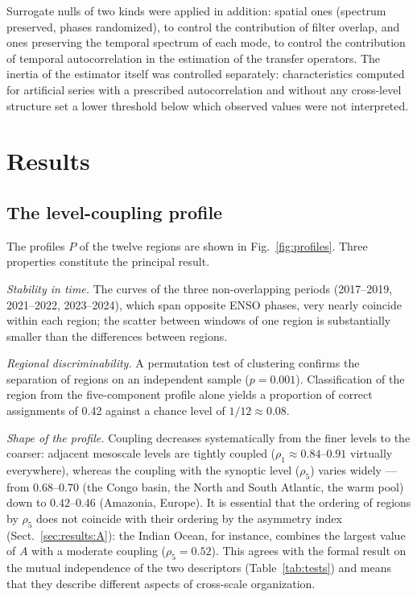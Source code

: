 \documentclass[11pt,a4paper]{article}
\begin{document}
Surrogate nulls of two kinds were applied in addition: spatial ones (spectrum preserved, phases randomized), to control the contribution of filter overlap, and ones preserving the temporal spectrum of each mode, to control the contribution of temporal autocorrelation in the estimation of the transfer operators. The inertia of the estimator itself was controlled separately: characteristics computed for artificial series with a prescribed autocorrelation and without any cross-level structure set a lower threshold below which observed values were not interpreted.

\section{Results}
\label{sec:results}

\subsection{The level-coupling profile}
\label{sec:results:P}

The profiles $P$ of the twelve regions are shown in Fig.~\ref{fig:profiles}. Three properties constitute the principal result.

\emph{Stability in time.} The curves of the three non-overlapping periods (2017--2019, 2021--2022, 2023--2024), which span opposite ENSO phases, very nearly coincide within each region; the scatter between windows of one region is substantially smaller than the differences between regions.

\emph{Regional discriminability.} A permutation test of clustering confirms the separation of regions on an independent sample ($p=0.001$). Classification of the region from the five-component profile alone yields a proportion of correct assignments of 0.42 against a chance level of $1/12\approx0.08$.

\emph{Shape of the profile.} Coupling decreases systematically from the finer levels to the coarser: adjacent mesoscale levels are tightly coupled ($\rho_1\approx0.84$--$0.91$ virtually everywhere), whereas the coupling with the synoptic level ($\rho_5$) varies widely --- from $0.68$--$0.70$ (the Congo basin, the North and South Atlantic, the warm pool) down to $0.42$--$0.46$ (Amazonia, Europe). It is essential that the ordering of regions by $\rho_5$ does not coincide with their ordering by the asymmetry index (Sect.~\ref{sec:results:A}): the Indian Ocean, for instance, combines the largest value of $A$ with a moderate coupling ($\rho_5=0.52$). This agrees with the formal result on the mutual independence of the two descriptors (Table~\ref{tab:tests}) and means that they describe different aspects of cross-scale organization.
\end{document}
